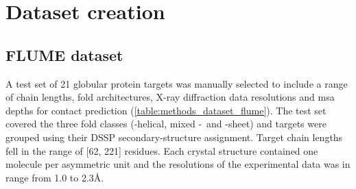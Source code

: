 \section{Dataset creation}
\subsection{FLUME dataset} \label{sec:methods_dataset_flume}
A test set of 21 globular protein targets was manually selected to include a range of chain lengths, fold architectures, X-ray diffraction data resolutions and \gls{msa} depths for contact prediction  (\cref{table:methods_dataset_flume}). The test set covered the three fold classes (\textalpha-helical, mixed \textalpha-\textbeta\ and \textbeta-sheet) and targets were grouped using their DSSP \cite{Kabsch1983-dy} secondary-structure assignment. Target chain lengths fell in the range of [62, 221] residues. Each crystal structure contained one molecule per asymmetric unit and the resolutions of the experimental data was in range from 1.0 to 2.3\AA.

